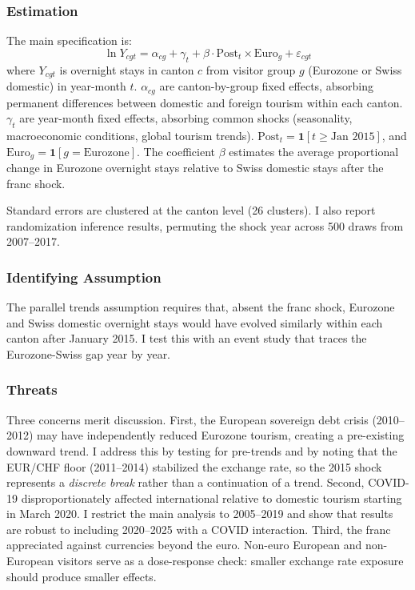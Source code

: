 \documentclass[12pt]{article}
\begin{document}
\subsubsection*{Estimation} The main specification is:
\begin{equation}
\ln Y_{cgt} = \alpha_{cg} + \gamma_t + \beta \cdot \text{Post}_t \times \text{Euro}_g + \varepsilon_{cgt}
\label{eq:main}
\end{equation}
where $Y_{cgt}$ is overnight stays in canton $c$ from visitor group $g$ (Eurozone or Swiss domestic) in year-month $t$. $\alpha_{cg}$ are canton-by-group fixed effects, absorbing permanent differences between domestic and foreign tourism within each canton. $\gamma_t$ are year-month fixed effects, absorbing common shocks (seasonality, macroeconomic conditions, global tourism trends). $\text{Post}_t = \mathbf{1}[t \geq \text{Jan 2015}]$, and $\text{Euro}_g = \mathbf{1}[g = \text{Eurozone}]$. The coefficient $\beta$ estimates the average proportional change in Eurozone overnight stays relative to Swiss domestic stays after the franc shock.

Standard errors are clustered at the canton level (26 clusters). I also report randomization inference results, permuting the shock year across 500 draws from 2007--2017.

\subsubsection*{Identifying Assumption} The parallel trends assumption requires that, absent the franc shock, Eurozone and Swiss domestic overnight stays would have evolved similarly within each canton after January 2015. I test this with an event study that traces the Eurozone-Swiss gap year by year.

\subsubsection*{Threats} Three concerns merit discussion. First, the European sovereign debt crisis (2010--2012) may have independently reduced Eurozone tourism, creating a pre-existing downward trend. I address this by testing for pre-trends and by noting that the EUR/CHF floor (2011--2014) stabilized the exchange rate, so the 2015 shock represents a \textit{discrete break} rather than a continuation of a trend. Second, COVID-19 disproportionately affected international relative to domestic tourism starting in March 2020. I restrict the main analysis to 2005--2019 and show that results are robust to including 2020--2025 with a COVID interaction. Third, the franc appreciated against currencies beyond the euro. Non-euro European and non-European visitors serve as a dose-response check: smaller exchange rate exposure should produce smaller effects.
\end{document}
